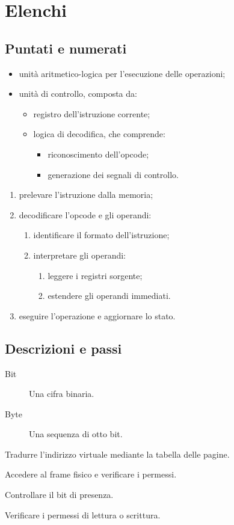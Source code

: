 \documentclass{../../../unipd-notes}
\begin{document}
\chapter{Elenchi}
\section{Puntati e numerati}
\begin{itemize}
  \item unità aritmetico-logica per l'esecuzione delle operazioni;
  \item unità di controllo, composta da:
    \begin{itemize}
      \item registro dell'istruzione corrente;
      \item logica di decodifica, che comprende:
        \begin{itemize}
          \item riconoscimento dell'opcode;
          \item generazione dei segnali di controllo.
        \end{itemize}
    \end{itemize}
\end{itemize}
\begin{enumerate}
  \item prelevare l'istruzione dalla memoria;
  \item decodificare l'opcode e gli operandi:
    \begin{enumerate}
      \item identificare il formato dell'istruzione;
      \item interpretare gli operandi:
        \begin{enumerate}
          \item leggere i registri sorgente;
          \item estendere gli operandi immediati.
        \end{enumerate}
    \end{enumerate}
  \item eseguire l'operazione e aggiornare lo stato.
\end{enumerate}
\section{Descrizioni e passi}
\begin{description}
  \item[Bit] Una cifra binaria.
  \item[Byte] Una sequenza di otto bit.
\end{description}
\begin{steps}
  \item Tradurre l'indirizzo virtuale mediante la tabella delle pagine.
  \item Accedere al frame fisico e verificare i permessi.
    \begin{steps}
      \item Controllare il bit di presenza.
      \item Verificare i permessi di lettura o scrittura.
    \end{steps}
\end{steps}
\end{document}
